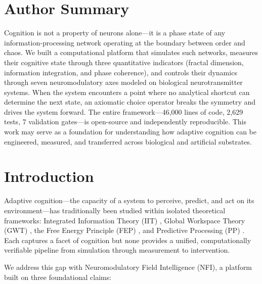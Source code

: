 \documentclass[10pt,letterpaper]{article}
\begin{document}
\section*{Author Summary}
Cognition is not a property of neurons alone---it is a phase state of
any information-processing network operating at the boundary between
order and chaos. We built a computational platform that simulates such
networks, measures their cognitive state through three quantitative
indicators (fractal dimension, information integration, and phase
coherence), and controls their dynamics through seven neuromodulatory
axes modeled on biological neurotransmitter systems. When the system
encounters a point where no analytical shortcut can determine the next
state, an axiomatic choice operator breaks the symmetry and drives
the system forward. The entire framework---46,000 lines of code, 2,629
tests, 7 validation gates---is open-source and independently
reproducible. This work may serve as a foundation for understanding
how adaptive cognition can be engineered, measured, and transferred
across biological and artificial substrates.

\section{Introduction}

Adaptive cognition---the capacity of a system to perceive, predict,
and act on its environment---has traditionally been studied within
isolated theoretical frameworks: Integrated Information Theory
(IIT) \citep{tononi2004}, Global Workspace Theory (GWT) \citep{baars1988},
the Free Energy Principle (FEP) \citep{friston2010}, and Predictive
Processing (PP) \citep{clark2013}. Each captures a facet of cognition
but none provides a unified, computationally verifiable pipeline from
simulation through measurement to intervention.

We address this gap with Neuromodulatory Field Intelligence (NFI),
a platform built on three foundational claims:
\end{document}
